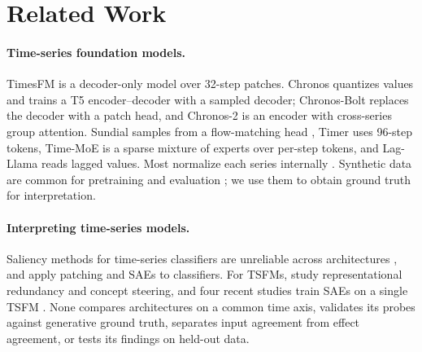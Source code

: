 \section{Related Work}
\label{sec:related}

\paragraph{Time-series foundation models.} TimesFM \citep{das2024timesfm} is a decoder-only model over 32-step patches.
Chronos \citep{ansari2024chronos} quantizes values and trains a T5 encoder--decoder \citep{raffel2020t5} with a sampled
decoder; Chronos-Bolt replaces the decoder with a patch head, and Chronos-2 \citep{ansari2025chronos2} is an encoder with
cross-series group attention. Sundial \citep{liu2025sundial} samples from a flow-matching head \citep{lipman2023flow},
Timer \citep{liu2024timer} uses 96-step tokens, Time-MoE \citep{shi2025timemoe} is a sparse mixture of experts over
per-step tokens, and Lag-Llama \citep{rasul2023lagllama} reads lagged values. Most normalize each series internally
\citep{kim2022revin}. Synthetic data are common for pretraining and evaluation \citep{kang2020gratis,dooley2023forecastpfn};
we use them to obtain ground truth for interpretation.

\paragraph{Interpreting time-series models.} Saliency methods for time-series classifiers are unreliable across
architectures \citep{ismail2020benchmarking}, and \citet{kalnare2025mechts} apply patching and SAEs to classifiers. For
TSFMs, \citet{wilinski2025exploring} study representational redundancy and concept steering, and four recent studies
train SAEs on a single TSFM \citep{mishra2026dissecting,oublal2026timesae,divo2026zeitgeist,yildirim2026superposition}.
None compares architectures on a common time axis, validates its probes against generative ground truth, separates input
agreement from effect agreement, or tests its findings on held-out data.

